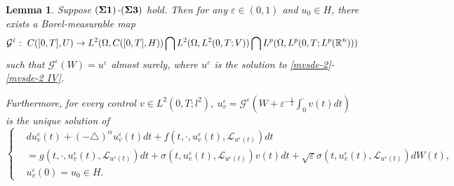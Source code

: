 \documentclass[11pt]{article}
\numberwithin{equation}{section}
\theoremstyle{plain}
\newtheorem{lemma}{Lemma}[section]
\begin{document}
 \begin{lemma} \label{measmap}
    Suppose $({\bf \Sigma 1})$-$({\bf \Sigma 3})$ hold.
    Then for any $\varepsilon \in (0,1)$ and $u_0 \in H$,
    there exists a Borel-measurable map
    {\small
        $$
        \mathcal{G}^\varepsilon{\large }:
        \    C([0,T],U)
        \rightarrow
        L^2(\Omega, C([0,T], H) )
        \bigcap
        L^2(\Omega, L^2(0,T; V) )
        \bigcap
        L^p(\Omega, L^p(0,T; L^p(\mathbb{R}^n ) ) )
        $$
    }
    such that
    $ \mathcal{G}^{\varepsilon} (W)= u^\varepsilon$
    almost surely,
    where $u^\varepsilon$ is the solution to
    \eqref{mvsde-2}-\eqref{mvsde-2 IV}.

    Furthermore,    for every control $v \in L^2(0,T; l^2) $,
    $u_v^\varepsilon
    = \mathcal{G}^\varepsilon \left( W + \varepsilon^{-\frac{1}{2}} \int_{0}^{\cdot} v(t) dt \right)$
    is the unique solution of
    \begin{equation}\label{sce}
        \left\{
        \begin{aligned}
            & d u_v^\varepsilon (t)
            + (-\triangle)^\alpha u_v^\varepsilon (t) dt
            + f(t, \cdot, u_v^\varepsilon(t), \mathcal{L}_{u^\varepsilon(t)} ) dt
            \\
            & = g(t, \cdot, u_v^\varepsilon(t), \mathcal{L}_{u^\varepsilon(t)} ) dt
            + \sigma(t, u_v^\varepsilon (t), \mathcal{L}_{u^\varepsilon(t)} ) v(t) dt
            + \sqrt{\varepsilon} \sigma(t, u_v^\varepsilon(t), \mathcal{L}_{u^\varepsilon(t)} ) dW(t),
            \\
            & u_v^\varepsilon (0) = u_0 \in H.
        \end{aligned}
        \right.
    \end{equation}
 \end{lemma}
\end{document}

